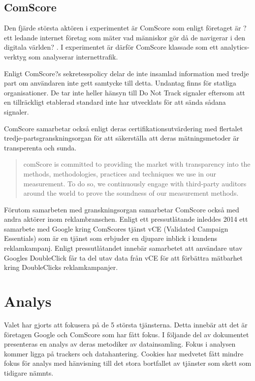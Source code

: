 \documentclass[a4paper,11pt]{article}
\begin{document}
{\subsection{ComScore}
Den fjärde största aktören i experimentet är ComScore som enligt företaget är ?ett ledande internet företag som mäter vad människor gör då de navigerar i den digitala världen? \cite{ComScoreAnalytics}. I experimentet är därför ComScore klassade som ett analytics-verktyg som analyserar internettrafik.

Enligt ComScore?s sekretesspolicy \cite{ComScorePrivacy} delar de inte insamlad information med tredje part om användaren inte gett samtycke till detta. Undantag finns för statliga organisationer. De tar inte heller hänsyn till Do Not Track signaler eftersom att en tillräckligt etablerad standard inte har utvecklats för att sända sådana signaler. 

ComScore samarbetar också enligt deras certifikationsutvärdering \cite{ComScoreThirdParty} med flertalet tredje-partsgranskningsorgan för att  säkerställa att deras mätningsmetoder är transperenta och sunda. 

\begin{quote}
comScore is committed to providing the market with transparency into the methods, methodologies, practices and techniques we use in our measurement. To do so, we continuously engage with third-party auditors around the world to prove the soundness of our measurement methods. \cite{ComScoreThirdParty}
\end{quote}

Förutom samarbeten med granskningsorgan samarbetar ComScore också med andra aktörer inom reklambranschen. Enligt ett pressutlåtande \cite{ComScorePartner} inleddes 2014 ett samarbete med Google kring ComScores tjänst vCE (Validated Campaign Essentials) som är en tjänst som erbjuder en djupare inblick i kundens reklamkampanj. Enligt pressutlåtandet  innebär samarbetet att användare utav Googles DoubleClick får ta del utav data från vCE för att förbättra mätbarhet kring DoubleClicks reklamkampanjer.

\section{Analys}
Valet har gjorts att fokusera på de 5 största tjänsterna. Detta innebär att det är företagen Google och ComScore som har fått fokus. I följande del av dokumentet presenteras en analys av deras metodiker av datainsamling. Fokus i analysen kommer ligga på trackers och datahantering. Cookies har medvetet fått mindre fokus för analys med hänvisning till det stora bortfallet av tjänster som skett som tidigare nämnts.


}
\end{document}
